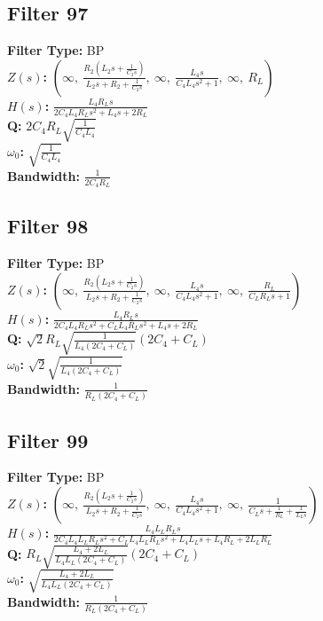 \documentclass{article}
\begin{document}
\subsection*{Filter 97}
\textbf{Filter Type:} BP \\ 
\textbf{$Z(s)$:} $\left( \infty, \  \frac{R_{2} \left(L_{2} s + \frac{1}{C_{2} s}\right)}{L_{2} s + R_{2} + \frac{1}{C_{2} s}}, \  \infty, \  \frac{L_{4} s}{C_{4} L_{4} s^{2} + 1}, \  \infty, \  R_{L}\right)$ \\ 
\textbf{$H(s)$:} $\frac{L_{4} R_{L} s}{2 C_{4} L_{4} R_{L} s^{2} + L_{4} s + 2 R_{L}}$ \\ 
\textbf{Q:} $2 C_{4} R_{L} \sqrt{\frac{1}{C_{4} L_{4}}}$ \\ 
\textbf{$\omega_0$:} $\sqrt{\frac{1}{C_{4} L_{4}}}$ \\ 
\textbf{Bandwidth:} $\frac{1}{2 C_{4} R_{L}}$ \\ 
\subsection*{Filter 98}
\textbf{Filter Type:} BP \\ 
\textbf{$Z(s)$:} $\left( \infty, \  \frac{R_{2} \left(L_{2} s + \frac{1}{C_{2} s}\right)}{L_{2} s + R_{2} + \frac{1}{C_{2} s}}, \  \infty, \  \frac{L_{4} s}{C_{4} L_{4} s^{2} + 1}, \  \infty, \  \frac{R_{L}}{C_{L} R_{L} s + 1}\right)$ \\ 
\textbf{$H(s)$:} $\frac{L_{4} R_{L} s}{2 C_{4} L_{4} R_{L} s^{2} + C_{L} L_{4} R_{L} s^{2} + L_{4} s + 2 R_{L}}$ \\ 
\textbf{Q:} $\sqrt{2} R_{L} \sqrt{\frac{1}{L_{4} \left(2 C_{4} + C_{L}\right)}} \left(2 C_{4} + C_{L}\right)$ \\ 
\textbf{$\omega_0$:} $\sqrt{2} \sqrt{\frac{1}{L_{4} \left(2 C_{4} + C_{L}\right)}}$ \\ 
\textbf{Bandwidth:} $\frac{1}{R_{L} \left(2 C_{4} + C_{L}\right)}$ \\ 
\subsection*{Filter 99}
\textbf{Filter Type:} BP \\ 
\textbf{$Z(s)$:} $\left( \infty, \  \frac{R_{2} \left(L_{2} s + \frac{1}{C_{2} s}\right)}{L_{2} s + R_{2} + \frac{1}{C_{2} s}}, \  \infty, \  \frac{L_{4} s}{C_{4} L_{4} s^{2} + 1}, \  \infty, \  \frac{1}{C_{L} s + \frac{1}{R_{L}} + \frac{1}{L_{L} s}}\right)$ \\ 
\textbf{$H(s)$:} $\frac{L_{4} L_{L} R_{L} s}{2 C_{4} L_{4} L_{L} R_{L} s^{2} + C_{L} L_{4} L_{L} R_{L} s^{2} + L_{4} L_{L} s + L_{4} R_{L} + 2 L_{L} R_{L}}$ \\ 
\textbf{Q:} $R_{L} \sqrt{\frac{L_{4} + 2 L_{L}}{L_{4} L_{L} \left(2 C_{4} + C_{L}\right)}} \left(2 C_{4} + C_{L}\right)$ \\ 
\textbf{$\omega_0$:} $\sqrt{\frac{L_{4} + 2 L_{L}}{L_{4} L_{L} \left(2 C_{4} + C_{L}\right)}}$ \\ 
\textbf{Bandwidth:} $\frac{1}{R_{L} \left(2 C_{4} + C_{L}\right)}$ \\ 
\end{document}
